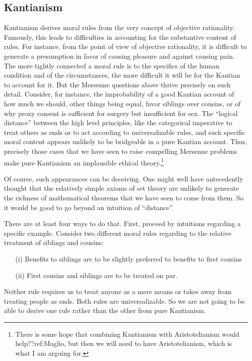 \subsection{Kantianism}
Kantianism  derives moral rules from the very concept of objective rationality. Famously, this leads to difficulties in
accounting for the substantive content of rules. For instance, from the point of view of objective rationality, it is difficult
to generate a presumption in favor of causing pleasure and against causing pain. The more tightly connected a moral rule is to the
specifics of the human condition and of the circumstances, the more difficult it will be for the Kantian to account for it. But the Mersenne questions above
thrive precisely on such detail. Consider, for instance, the improbability of a good Kantian account of how much we 
should, other things being equal, favor siblings over cousins, or of why proxy consent is sufficient for surgery but insufficient for
sex. The ``logical distance'' between the high level principles, like the categorical imperative to treat others as ends or to act according to universalizable rules, and such specific moral content appears unlikely to be bridgeable in a pure Kantian account.
Thus, precisely those cases that we have seen to raise compelling Mersenne problems make pure Kantianism an implausible ethical theory.\footnote{There is some hope that combining Kantianism with Aristotelianism would help??ref:Maglio, but then
we will need to have Aristotelianism, which is what I am arguing for. }

Of course, such appearances can be deceiving. One might well have antecedently thought that the relatively simple axioms of set 
theory are unlikely to generate the richness of mathematical theorems that we have seen to come from them. So it would be good
to go beyond an intuition of ``distance''.

There are at least four ways to do that. First, proceed by intuitions regarding a specific example. Consider two different moral rules regarding to the relative treatment
of siblings and cousins:
\begin{enumerate}
\item[(i)] Benefits to siblings are to be slightly preferred to benefits to first cousins
\item[(ii)] First cousins and siblings are to be treated on par.
\end{enumerate}
Neither rule requires us to treat anyone as a mere means or 
takes away from treating people as ends. Both rules are universalizable. So we are not going to be able to derive one rule rather
than the other from pure Kantianism.

